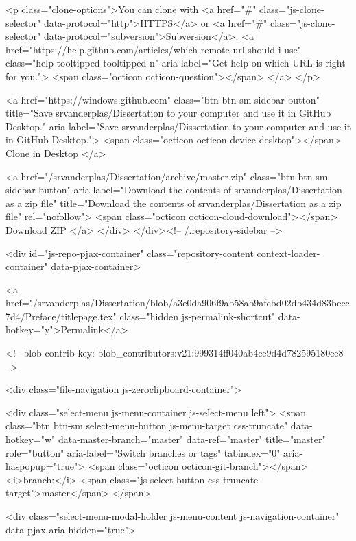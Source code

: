 <p class="clone-options">You can clone with
  <a href="#" class="js-clone-selector" data-protocol="http">HTTPS</a> or <a href="#" class="js-clone-selector" data-protocol="subversion">Subversion</a>.
  <a href="https://help.github.com/articles/which-remote-url-should-i-use" class="help tooltipped tooltipped-n" aria-label="Get help on which URL is right for you.">
    <span class="octicon octicon-question"></span>
  </a>
</p>


  <a href="https://windows.github.com" class="btn btn-sm sidebar-button" title="Save srvanderplas/Dissertation to your computer and use it in GitHub Desktop." aria-label="Save srvanderplas/Dissertation to your computer and use it in GitHub Desktop.">
    <span class="octicon octicon-device-desktop"></span>
    Clone in Desktop
  </a>


                <a href="/srvanderplas/Dissertation/archive/master.zip"
                   class="btn btn-sm sidebar-button"
                   aria-label="Download the contents of srvanderplas/Dissertation as a zip file"
                   title="Download the contents of srvanderplas/Dissertation as a zip file"
                   rel="nofollow">
                  <span class="octicon octicon-cloud-download"></span>
                  Download ZIP
                </a>
              </div>
        </div><!-- /.repository-sidebar -->

        <div id="js-repo-pjax-container" class="repository-content context-loader-container" data-pjax-container>

          

<a href="/srvanderplas/Dissertation/blob/a3e0da906f9ab58ab9afcbd02db434d83beee7d4/Preface/titlepage.tex" class="hidden js-permalink-shortcut" data-hotkey="y">Permalink</a>

<!-- blob contrib key: blob_contributors:v21:999314ff040ab4ce9d4d782595180ee8 -->

<div class="file-navigation js-zeroclipboard-container">
  
<div class="select-menu js-menu-container js-select-menu left">
  <span class="btn btn-sm select-menu-button js-menu-target css-truncate" data-hotkey="w"
    data-master-branch="master"
    data-ref="master"
    title="master"
    role="button" aria-label="Switch branches or tags" tabindex="0" aria-haspopup="true">
    <span class="octicon octicon-git-branch"></span>
    <i>branch:</i>
    <span class="js-select-button css-truncate-target">master</span>
  </span>

  <div class="select-menu-modal-holder js-menu-content js-navigation-container" data-pjax aria-hidden="true">

